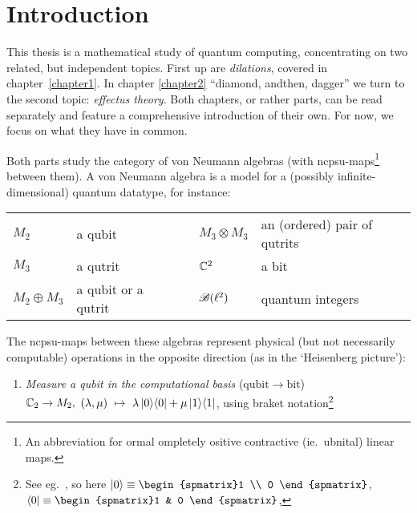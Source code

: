 \documentclass[b]{subfiles}
\begin{document}
\chapter{Introduction}
\begin{parsec}%
\begin{point}%
This thesis is a mathematical study of quantum computing, concentrating
    on two related, but independent topics.
First up are \emph{dilations}, covered in chapter~\ref{chapter1}.
    In chapter \ref{chapter2}
    ``diamond, andthen, dagger''
    we turn to the second topic: \emph{effectus theory}.
Both chapters, or rather parts, can be read separately
    and feature a comprehensive introduction of their own.
For now, we focus on what they have in common.
\begin{point}%
Both parts study the category of von Neumann algebras
    (with ncpsu-maps\footnote{%
        An abbreviation for ormal ompletely ositive contractive (ie.~ubnital) linear maps.} between them).
A von Neumann algebra is a model for a (possibly infinite-dimensional)
    quantum datatype, for instance:
\begin{center}
    \begin{tabular}{lllll}
        $M_2$ & a qubit &\quad\qquad& $M_3 \otimes M_3$ & an (ordered) pair of qutrits \\
        $M_3$ & a qutrit && $\mathbb{C}^2$ & a bit \\
        $M_2 \oplus M_3$ & a qubit or a qutrit &
        & $\mathscr{B}(\ell^2)$ & quantum integers
\end{tabular}
\end{center}
The ncpsu-maps between these algebras represent physical
    (but not necessarily computable) operations
        in the opposite direction
        (as in the `Heisenberg picture'):
\begin{enumerate}
\item
    \emph{Measure a qubit in the computational basis} \quad
            ($\mathrm{qubit} \to \mathrm{bit}$)\\
        $\mathbb{C}_2 \rightarrow M_2,$ \quad 
        $(\lambda,\mu) \ \mapsto\ \lambda \left|0\right>\!\left<0\right| + \mu \left|1\right>\!\left<1\right|$,
        \quad using braket notation\footnote{%
            See eg.~\cite[fig.~2.1]{nielsen2002quantum},
            so here
            $\ket{0}\equiv\begin{spmatrix}1 \\ 0 \end{spmatrix}$,
            $\bra{0}\equiv\begin{spmatrix}1 & 0 \end{spmatrix}$,
}
\end{enumerate}
\end{point}
\end{point}
\end{parsec}
\end{document}
